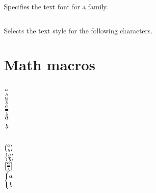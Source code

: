 \begin{table}[htb]
\subsection{}
Specifies the text font for a family.

\subsection{}
Selects the text style for the following characters.



\section{Math macros}


\subsection{}
\begin{LTXexample}[width=0.2\linewidth]
$a\above0pt b$\\[8pt]

${a\above1pt b}$\\[8pt]

${a\above2.5pt b}$\\[8pt]

$\displaystyle{a\above0pt b}$
\end{LTXexample}



\subsection{}
\begin{LTXexample}[width=0.2\linewidth]
$a\abovewithdelims()0pt b$\\[8pt]

\def\fdelimA{\abovewithdelims\{)1.0pt}
${a\fdelimA b}$\\[8pt]

\def\fdelimB{\abovewithdelims[]2.0pt}
${a\fdelimB b}$\\[8pt]

\def\fdelimC{\abovewithdelims\{.0pt}
$\displaystyle{a\fdelimC b}$
\end{LTXexample}

\subsection{}


\end{table}
